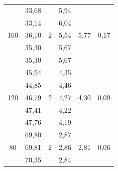 \documentclass[a4paper, 12pt]{article}
\begin{document}
\begin{table}[H]
\begin{tabular}{|c|ccccc|}
            \multirow{5}{*}{160} & \multicolumn{1}{c|}{33,68} & \multicolumn{1}{c|}{\multirow{5}{*}{2}} & \multicolumn{1}{c|}{5,94} & \multicolumn{1}{c|}{\multirow{5}{*}{5,77}} & \multirow{5}{*}{0,17} \\ \cline{2-2} \cline{4-4}
             & \multicolumn{1}{c|}{33,14} & \multicolumn{1}{c|}{} & \multicolumn{1}{c|}{6,04} & \multicolumn{1}{c|}{} &  \\ \cline{2-2} \cline{4-4}
             & \multicolumn{1}{c|}{36,10} & \multicolumn{1}{c|}{} & \multicolumn{1}{c|}{5,54} & \multicolumn{1}{c|}{} &  \\ \cline{2-2} \cline{4-4}
             & \multicolumn{1}{c|}{35,30} & \multicolumn{1}{c|}{} & \multicolumn{1}{c|}{5,67} & \multicolumn{1}{c|}{} &  \\ \cline{2-2} \cline{4-4}
             & \multicolumn{1}{c|}{35,30} & \multicolumn{1}{c|}{} & \multicolumn{1}{c|}{5,67} & \multicolumn{1}{c|}{} &  \\ \hline
            \multirow{5}{*}{120} & \multicolumn{1}{c|}{45,94} & \multicolumn{1}{c|}{\multirow{5}{*}{2}} & \multicolumn{1}{c|}{4,35} & \multicolumn{1}{c|}{\multirow{5}{*}{4,30}} & \multirow{5}{*}{0,09} \\ \cline{2-2} \cline{4-4}
             & \multicolumn{1}{c|}{44,85} & \multicolumn{1}{c|}{} & \multicolumn{1}{c|}{4,46} & \multicolumn{1}{c|}{} &  \\ \cline{2-2} \cline{4-4}
             & \multicolumn{1}{c|}{46,79} & \multicolumn{1}{c|}{} & \multicolumn{1}{c|}{4,27} & \multicolumn{1}{c|}{} &  \\ \cline{2-2} \cline{4-4}
             & \multicolumn{1}{c|}{47,41} & \multicolumn{1}{c|}{} & \multicolumn{1}{c|}{4,22} & \multicolumn{1}{c|}{} &  \\ \cline{2-2} \cline{4-4}
             & \multicolumn{1}{c|}{47,76} & \multicolumn{1}{c|}{} & \multicolumn{1}{c|}{4,19} & \multicolumn{1}{c|}{} &  \\ \hline
            \multirow{5}{*}{80} & \multicolumn{1}{c|}{69,80} & \multicolumn{1}{c|}{\multirow{5}{*}{2}} & \multicolumn{1}{c|}{2,87} & \multicolumn{1}{c|}{\multirow{5}{*}{2,81}} & \multirow{5}{*}{0,06} \\ \cline{2-2} \cline{4-4}
             & \multicolumn{1}{c|}{69,81} & \multicolumn{1}{c|}{} & \multicolumn{1}{c|}{2,86} & \multicolumn{1}{c|}{} &  \\ \cline{2-2} \cline{4-4}
             & \multicolumn{1}{c|}{70,35} & \multicolumn{1}{c|}{} & \multicolumn{1}{c|}{2,84} & \multicolumn{1}{c|}{} &  \\ \cline{2-2} \cline{4-4}

\end{tabular}
\end{table}
\end{document}
